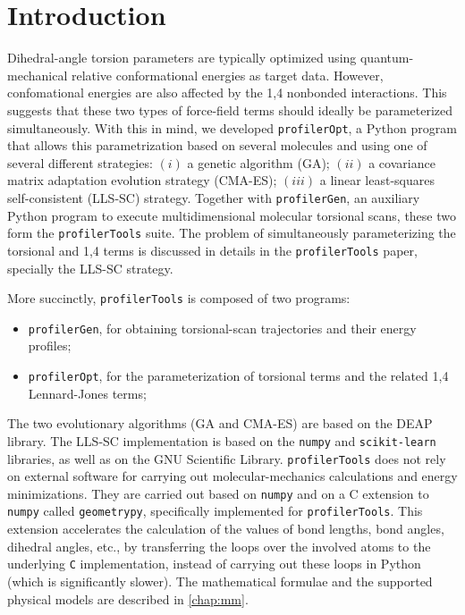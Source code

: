 \documentclass[10pt,a4paper,openany]{memoir}
\numberwithin{equation}{section}
\newcommand{\profileropt}[0]{\texttt{profilerOpt}}
\newcommand{\profilergen}[0]{\texttt{profilerGen}}
\newcommand{\profilertools}[0]{\texttt{profilerTools}}
\begin{document}
\tableofcontents

  \mainmatter

\newcommand*{\profi}{\texttt{profilerOpt}}

\chapter{Introduction}
\label{chap:intro}

Dihedral-angle torsion parameters are typically optimized using
quantum-mechanical relative conformational energies as target data.
%
However, confomational energies are also affected by the 1,4 nonbonded
interactions.
%
This suggests that these two types of force-field terms should ideally
be parameterized simultaneously.
%
With this in mind, we developed \profileropt{}, a Python program that
allows this parametrization based on several molecules and using one
of several different strategies: $(i)$ a genetic algorithm (GA);
$(ii)$ a covariance matrix adaptation evolution strategy (CMA-ES);
$(iii)$ a linear least-squares self-consistent (LLS-SC) strategy.
%
Together with \profilergen{}, an auxiliary Python program to execute
multidimensional molecular torsional scans, these two form the
\profilertools{} suite.
%
The problem of simultaneously parameterizing the torsional and 1,4
terms is discussed in details in the \profilertools{}
paper\cite{PAPER}, specially the LLS-SC strategy.
%

More succinctly, \profilertools{} is composed of two programs:

\begin{itemize}
\item \profilergen, for obtaining torsional-scan trajectories and
  their energy profiles;
\item \profileropt, for the parameterization of torsional terms and
  the related 1,4 Lennard-Jones terms;
\end{itemize}

The two evolutionary algorithms (GA and CMA-ES) are based on the DEAP
library\cite{DEAP}.
%
The LLS-SC implementation is based on the \texttt{numpy} and
\texttt{scikit-learn} libraries, as well as on the GNU Scientific
Library.
%
\profilertools{} does not rely on external software for carrying out
molecular-mechanics calculations and energy minimizations.
%
They are carried out based on \texttt{numpy} and on a C extension to
\texttt{numpy} called \texttt{geometrypy}, specifically implemented
for \profilertools{}. This extension accelerates the calculation of
the values of bond lengths, bond angles, dihedral angles, etc., by
transferring the loops over the involved atoms to the underlying
\texttt{C} implementation, instead of carrying out these loops in
Python (which is significantly slower).
%
The mathematical formulae and the supported physical models are
described in \autoref{chap:mm}. 
\end{document}

